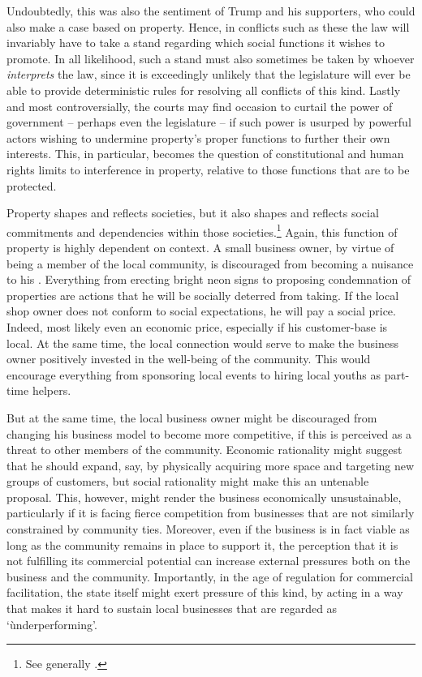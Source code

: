 Undoubtedly, this was also the sentiment of Trump and his supporters, who could also make a case based on property. Hence, in conflicts such as these the law will invariably have to take a stand regarding which social functions it wishes to promote. In all likelihood, such a stand must also sometimes be taken by whoever {\it interprets} the law, since it is exceedingly unlikely that the legislature will ever be able to provide deterministic rules for resolving all conflicts of this kind. Lastly and most controversially, the courts may find occasion to curtail the power of government -- perhaps even the legislature -- if such power is usurped by powerful actors wishing to undermine property's proper functions to further their own interests. This, in particular, becomes the question of constitutional and human rights limits to interference in property, relative to those functions that are to be protected.

Property shapes and reflects societies, but it also shapes and reflects social commitments and dependencies within those societies.\footnote{See generally \cite{alexander09}.} Again, this function of property is highly dependent on context. A small business owner, by virtue of being a member of the local community, is discouraged from becoming a nuisance to his . Everything from erecting bright neon signs to proposing condemnation of  properties are actions that he will be socially deterred from taking. If the local shop owner does not conform to social expectations, he will pay a social price. Indeed, most likely even an economic price, especially if his customer-base is local. At the same time, the local connection would serve to make the business owner positively invested in the well-being of the community. This would encourage everything from sponsoring local events to hiring local youths as part-time helpers.

But at the same time, the local business owner might be discouraged from changing his business model to become more competitive, if this is perceived as a threat to other members of the community. Economic rationality might suggest that he should expand, say, by physically acquiring more space and targeting new groups of customers, but social rationality might make this an untenable proposal. This, however, might render the business economically unsustainable, particularly if it is facing fierce competition from businesses that are not similarly constrained by community ties. Moreover, even if the business is in fact viable as long as the community remains in place to support it, the perception that it is not fulfilling its commercial potential can increase external pressures both on the business and the community. Importantly, in the age of regulation for commercial facilitation, the state itself might exert pressure of this kind, by acting in a way that makes it hard to sustain local businesses that are regarded as `ùnderperforming'.

